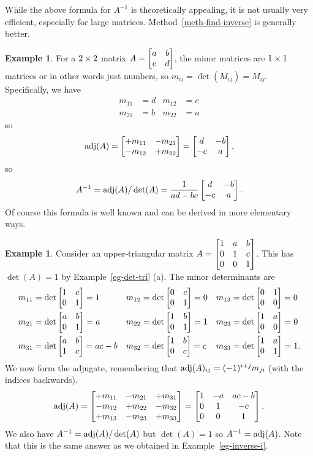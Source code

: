 \documentclass[reqno]{amsart}
\theoremstyle{definition}
\newtheorem{example}[theorem]{Example}
\begin{document}
While the above formula for $A^{-1}$ is theoretically appealing,
it is not usually very efficient, especially for large matrices.
Method~\ref{meth-find-inverse} is generally better.

\begin{example}\label{eg-adjugate-two}
 For a $2\times 2$ matrix $A=\left[\begin{matrix} a&b\\ c&d\end{matrix}\right]$, the minor matrices are
 $1\times 1$ matrices or in other words just numbers, so
 $m_{ij}=\det(M_{ij})=M_{ij}$.  Specifically, we have
 \begin{align*}
  m_{11} &= d & m_{12} &= c \\
  m_{21} &= b & m_{22} &= a
 \end{align*}
 so 
 \[ \operatorname{adj}(A) = \left[\begin{matrix} +m_{11} & -m_{21} \\ -m_{12} & +m_{22}\end{matrix}\right]
     = \left[\begin{matrix} d & -b \\ -c & a \end{matrix}\right],
 \]
 so 
 \[ A^{-1} = 
     \operatorname{adj}(A)/\det(A) = 
      \frac{1}{ad-bc} \left[\begin{matrix} d & -b \\ -c & a \end{matrix}\right].
 \]
 Of course this formula is well known and can be derived in more
 elementary ways.
\end{example}

\begin{example}\label{eg-adjugate-tri}
 Consider an upper-triangular matrix
 $A=\left[\begin{matrix} 1&a&b \\
         0&1&c \\
         0&0&1\end{matrix}\right]$.
 This has $\det(A)=1$ by Example~\ref{eg-det-tri} (a).  The minor
 determinants are
 \begin{align*}
  m_{11} &= \det\left[\begin{matrix} 1&c\\0&1\end{matrix}\right] = 1 &
  m_{12} &= \det\left[\begin{matrix} 0&c\\0&1\end{matrix}\right] = 0 &
  m_{13} &= \det\left[\begin{matrix} 0&1\\0&0\end{matrix}\right] = 0 \\
  m_{21} &= \det\left[\begin{matrix} a&b\\0&1\end{matrix}\right] = a &
  m_{22} &= \det\left[\begin{matrix} 1&b\\0&1\end{matrix}\right] = 1 &
  m_{23} &= \det\left[\begin{matrix} 1&a\\0&0\end{matrix}\right] = 0 \\
  m_{31} &= \det\left[\begin{matrix} a&b\\1&c\end{matrix}\right] = ac-b &
  m_{32} &= \det\left[\begin{matrix} 1&b\\0&c\end{matrix}\right] = c &
  m_{33} &= \det\left[\begin{matrix} 1&a\\0&1\end{matrix}\right] = 1.
 \end{align*}
 We now form the adjugate, remembering that
 $\operatorname{adj}(A)_{ij}=(-1)^{i+j}m_{ji}$ (with the indices backwards).
 \[
   \operatorname{adj}(A) =
   \left[\begin{matrix} +m_{11} & -m_{21} & +m_{31} \\
        -m_{12} & +m_{22} & -m_{32} \\
        +m_{13} & -m_{23} & +m_{33}
   \end{matrix}\right]
   =
   \left[\begin{matrix}
    1 & -a & ac-b \\ 0 & 1 & -c \\ 0 & 0 & 1
   \end{matrix}\right].
 \]
 We also have $A^{-1}=\operatorname{adj}(A)/\det(A)$ but $\det(A)=1$ so
 $A^{-1}=\operatorname{adj}(A)$.  Note that this is the same answer as we obtained
 in Example~\ref{eg-inverse-i}.
\end{example}
\end{document}
